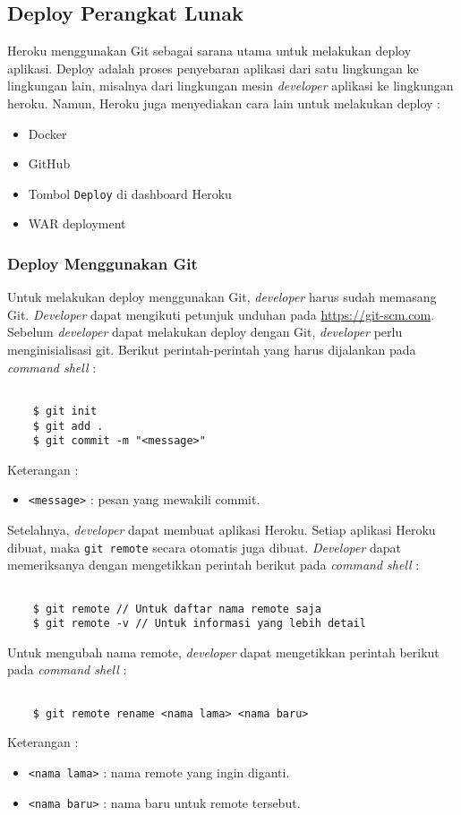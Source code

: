 \subsection{Deploy Perangkat Lunak}
Heroku menggunakan Git sebagai sarana  utama untuk melakukan deploy aplikasi. Deploy adalah proses penyebaran aplikasi dari satu lingkungan ke lingkungan lain, misalnya dari lingkungan mesin \textit{developer} aplikasi ke lingkungan heroku. Namun, Heroku juga menyediakan cara lain untuk melakukan deploy :
\begin{itemize}
\item Docker
\item GitHub
\item Tombol \texttt{Deploy} di dashboard Heroku
\item WAR deployment
\end{itemize}

\subsubsection{Deploy Menggunakan Git}
Untuk melakukan deploy menggunakan Git, \textit{developer} harus sudah memasang Git. \textit{Developer} dapat mengikuti petunjuk unduhan pada \url{https://git-scm.com}. Sebelum \textit{developer} dapat melakukan deploy dengan Git, \textit{developer} perlu menginisialisasi git. Berikut perintah-perintah yang harus dijalankan pada \textit{command shell} :
\begin{lstlisting}

	$ git init
	$ git add .
	$ git commit -m "<message>"

\end{lstlisting}
Keterangan :
\begin{itemize}
\item \texttt{<message>} : pesan yang mewakili commit.
\end{itemize}

Setelahnya, \textit{developer} dapat membuat aplikasi Heroku. Setiap aplikasi Heroku dibuat, maka \texttt{git remote} secara otomatis juga dibuat. \textit{Developer} dapat memeriksanya dengan mengetikkan perintah berikut pada \textit{command shell} :
\begin{lstlisting}

	$ git remote // Untuk daftar nama remote saja
	$ git remote -v // Untuk informasi yang lebih detail

\end{lstlisting}

Untuk mengubah nama remote, \textit{developer} dapat mengetikkan perintah berikut pada \textit{command shell} :
\begin{lstlisting}

	$ git remote rename <nama lama> <nama baru>

\end{lstlisting}
Keterangan :
\begin{itemize}
\item \texttt{<nama lama>} : nama remote yang ingin diganti.
\item \texttt{<nama baru>} : nama baru untuk remote tersebut.
\end{itemize}

